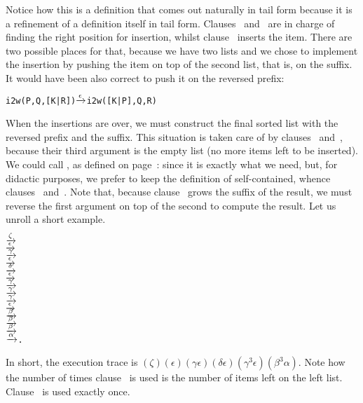 Notice how this is a definition that comes out naturally in tail form
because it is a refinement of a definition itself in tail
form. Clauses \clause{\gamma}~and~\clause{\delta} are in charge of
finding the right position for insertion, whilst
clause~\clause{\epsilon} inserts the item. There are two possible
places for that, because we have two lists and we chose to implement
the insertion by pushing the item on top of the second list, that is,
on the suffix. It would have been also correct to push it on the
reversed prefix:
\begin{alltt}
i2w(    P,    Q,  [K|R]) \(\smashedrightarrow{\epsilon}\) i2w([K|P],   Q, R)
\end{alltt}
When the insertions are over, we must construct the final sorted list
with the reversed prefix and the suffix. This situation is taken care
of by clauses \clause{\alpha}~and~\clause{\beta}, because their third
argument is the empty list (no more items left to be inserted). We
could call , as defined on
page~\pageref{code:rev_join}:
 since it is exactly what we need, but,
for didactic purposes, we prefer to keep the definition of
 self\hyp{}contained, whence clauses
\clause{\alpha}~and~\clause{\beta}. Note that, because
clause~\clause{\epsilon} grows the suffix of the result, we must
reverse the first argument on top of the second to compute the
result. Let us unroll a short example.
\begin{alltt}
 \(\smashedrightarrow{\zeta}\) 
               \(\smashedrightarrow{\epsilon}\) 
               \(\smashedrightarrow{\gamma}\) 
               \(\smashedrightarrow{\epsilon}\) 
               \(\smashedrightarrow{\delta}\) 
               \(\smashedrightarrow{\epsilon}\) 
               \(\smashedrightarrow{\gamma}\) 
               \(\smashedrightarrow{\gamma}\) 
               \(\smashedrightarrow{\gamma}\) 
               \(\smashedrightarrow{\epsilon}\) 
               \(\smashedrightarrow{\beta}\) 
               \(\smashedrightarrow{\beta}\) 
               \(\smashedrightarrow{\beta}\) 
               \(\smashedrightarrow{\alpha}\) \erlcode{[1,2,3,4]}\textrm{.}
\end{alltt}
In short, the execution trace is \((\zeta)(\epsilon)(\gamma\epsilon)
(\delta\epsilon)(\gamma^3\epsilon)(\beta^3\alpha)\). Note how the
number of times clause~\clause{\beta} is used is the number of items
left on the left list. Clause~\clause{\alpha} is used exactly once.

